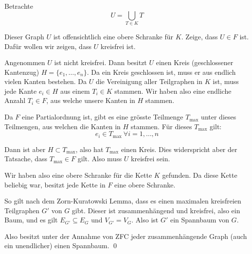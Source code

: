 \documentclass[12pt]{article}
\begin{document}
Betrachte
\[
    U = \bigcup_{T \in K} T
\]

Dieser Graph $U$ ist offensichtlich eine obere Schranke für $K$. Zeige, dass $U \in F$ ist. Dafür wollen wir zeigen, dass $U$ kreisfrei ist.

Angenommen $U$ ist nicht kreisfrei. Dann besitzt $U$ einen Kreis (geschlossener Kantenzug) $H = \{e_1,\dots,e_n\}$. Da ein Kreis geschlossen ist, muss er aus endlich vielen Kanten bestehen. Da $U$ die Vereinigung aller Teilgraphen in $K$ ist, muss jede Kante $e_i \in H$ aus einem $T_i \in K$ stammen. Wir haben also eine endliche Anzahl $T_i \in F$, aus welche unsere Kanten in $H$ stammen.

Da $F$ eine Partialordnung ist, gibt es eine grösste Teilmenge $T_\text{max}$ unter dieses Teilmengen, aus welchen die Kanten in $H$ stammen. Für dieses $T_\text{max}$ gilt:
\[
    e_i \in T_\text{max} \ \forall i = 1,\dots,n
\]

Dann ist aber $H \subset T_\text{max}$, also hat $T_\text{max}$ einen Kreis. Dies widerspricht aber der Tatsache, dass $T_\text{max} \in F$ gilt. Also muss $U$ kreisfrei sein.

Wir haben also eine obere Schranke für die Kette $K$ gefunden. Da diese Kette beliebig war, besitzt jede Kette in $F$ eine obere Schranke.

So gilt nach dem Zorn-Kuratowski Lemma, dass es einen maximalen kreisfreien Teilgraphen $G'$ von $G$ gibt. Dieser ist zusammenhängend und kreisfrei, also ein Baum, und es gilt $E_{G'} \subseteq E_G$ und $V_{G'} = V_G$. Also ist $G'$ ein Spannbaum von $G$.

Also besitzt unter der Annahme von ZFC jeder zusammenhängende Graph (auch ein unendlicher) einen Spannbaum. \qed
\end{document}
